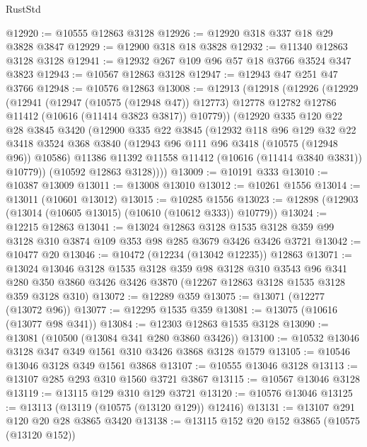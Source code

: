 \begin{lexlean}{RustStd}
\begin{coremodule}
@12920 := @10555 @12863 @3128
@12926 := @12920 @318 @337 @18 @29 @3828 @3847
@12929 := @12900 @318 @18 @3828
@12932 := @11340 @12863 @3128 @3128
@12941 := @12932 @267 @109 @96 @57 @18 @3766 @3524 @347 @3823
@12943 := @10567 @12863 @3128
@12947 := @12943 @47 @251 @47 @3766
@12948 := @10576 @12863
@13008 := @12913
    (@12918
      (@12926
        (@12929
          (@12941
            (@12947 (@10575 (@12948 @47)) @12773)
            @12778
            @12782
            @12786
            @11412
            (@10616 (@11414 @3823 @3817))
            @10779))
        (@12920
          @335
          @120
          @22
          @28
          @3845
          @3420
          (@12900
            @335
            @22
            @3845
            (@12932
              @118
              @96
              @129
              @32
              @22
              @3418
              @3524
              @368
              @3840
              (@12943 @96 @111 @96 @3418 (@10575 (@12948 @96)) @10586)
              @11386
              @11392
              @11558
              @11412
              (@10616 (@11414 @3840 @3831))
              @10779))
          (@10592 @12863 @3128))))
@13009 := @10191 @333
@13010 := @10387 @13009
@13011 := @13008 @13010
@13012 := @10261 @1556
@13014 := @13011 (@10601 @13012)
@13015 := @10285 @1556
@13023 := @12898 (@12903 (@13014 (@10605 @13015) (@10610 (@10612 @333)) @10779))
@13024 := @12215 @12863
@13041 := @13024
    @12863
    @3128
    @1535
    @3128
    @359
    @99
    @3128
    @310
    @3874
    @109
    @353
    @98
    @285
    @3679
    @3426
    @3426
    @3721
@13042 := @10477 @20
@13046 := @10472 (@12234 (@13042 @12235)) @12863
@13071 := @13024
    @13046
    @3128
    @1535
    @3128
    @359
    @98
    @3128
    @310
    @3543
    @96
    @341
    @280
    @350
    @3860
    @3426
    @3426
    @3870
    (@12267 @12863 @3128 @1535 @3128 @359 @3128 @310)
@13072 := @12289 @359
@13075 := @13071 (@12277 (@13072 @96))
@13077 := @12295 @1535 @359
@13081 := @13075 (@10616 (@13077 @98 @341))
@13084 := @12303 @12863 @1535 @3128
@13090 := @13081 (@10500 (@13084 @341 @280 @3860 @3426))
@13100 := @10532 @13046 @3128 @347 @349 @1561 @310 @3426 @3868 @3128 @1579
@13105 := @10546 @13046 @3128 @349 @1561 @3868
@13107 := @10555 @13046 @3128
@13113 := @13107 @285 @293 @310 @1560 @3721 @3867
@13115 := @10567 @13046 @3128
@13119 := @13115 @129 @310 @129 @3721
@13120 := @10576 @13046
@13125 := @13113 (@13119 (@10575 (@13120 @129)) @12416)
@13131 := @13107 @291 @120 @20 @28 @3865 @3420
@13138 := @13115 @152 @20 @152 @3865 (@10575 (@13120 @152))

\end{coremodule}
\end{lexlean}

